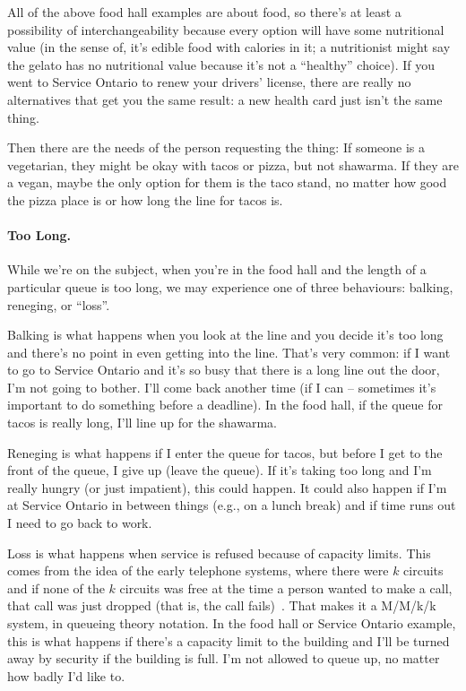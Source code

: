 All of the above food hall examples are about food, so there's at least a possibility of interchangeability because every option will have some nutritional value (in the sense of, it's edible food with calories in it; a nutritionist might say the gelato has no nutritional value because it's not a ``healthy'' choice). If you went to Service Ontario to renew your drivers' license, there are really no alternatives that get you the same result: a new health card just isn't the same thing.

Then there are the needs of the person requesting the thing:  If someone is a vegetarian, they might be okay with tacos or pizza, but not shawarma. If they are a vegan, maybe the only option for them is the taco stand, no matter how good the pizza place is or how long the line for tacos is.

\paragraph{Too Long.} 
While we're on the subject, when you're in the food hall and the length of a particular queue is too long, we may experience one of three behaviours: balking, reneging, or ``loss''. 

Balking is what happens when you look at the line and you decide it's too long and there's no point in even getting into the line. That's very common: if I want to go to Service Ontario and it's so busy that there is a long line out the door, I'm not going to bother. I'll come back another time (if I can -- sometimes it's important to do something before a deadline). In the food hall, if the queue for tacos is really long, I'll line up for the shawarma. 

Reneging is what happens if I enter the queue for tacos, but before I get to the front of the queue, I give up (leave the queue). If it's taking too long and I'm really hungry (or just impatient), this could happen. It could also happen if I'm at Service Ontario in between things (e.g., on a lunch break) and if time runs out I need to go back to work.

Loss is what happens when service is refused because of capacity limits. This comes from the idea of the early telephone systems, where there were $k$ circuits and if none of the $k$ circuits was free at the time a person wanted to make a call, that call was just dropped (that is, the call fails)~\cite{pmd}. That makes it a M/M/k/k system, in queueing theory notation. In the food hall or Service Ontario example, this is what happens if there's a capacity limit to the building and I'll be turned away by security if the building is full. I'm not allowed to queue up, no matter how badly I'd like to.

